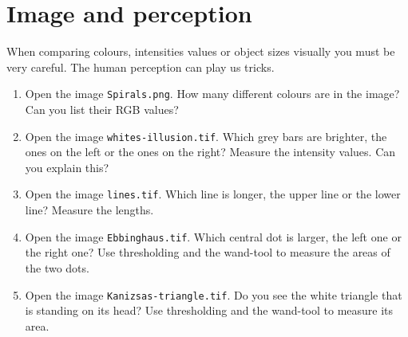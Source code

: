 \section{Image and perception}

When comparing colours, intensities values or object sizes visually you must be very careful. The human perception can play us tricks.

\begin{enumerate}

\item Open the image \texttt{Spirals.png}. How many different colours are in the image? Can you list their RGB values?

\fbox{
	\begin{minipage}{\linewidth}
		\hfill\vspace{1cm}
	\end{minipage}
	}

\item Open the image \texttt{whites-illusion.tif}. Which grey bars are brighter, the ones on the left or the ones on the right? Measure the intensity values. Can you explain this?

\fbox{
	\begin{minipage}{\linewidth}
		\hfill\vspace{1cm}
	\end{minipage}
	}

\item Open the image \texttt{lines.tif}. Which line is longer, the upper line or the lower line? Measure the lengths.

\fbox{
	\begin{minipage}{\linewidth}
		\hfill\vspace{1cm}
	\end{minipage}
	}

\item Open the image \texttt{Ebbinghaus.tif}. Which central dot is larger, the left one or the right one? Use thresholding and the wand-tool to measure the areas of the two dots.

\fbox{
	\begin{minipage}{\linewidth}
		\hfill\vspace{1cm}
	\end{minipage}
	}

\item Open the image \texttt{Kanizsas-triangle.tif}. Do you see the white triangle that is standing on its head? Use thresholding and the wand-tool to measure its area.

\fbox{
	\begin{minipage}{\linewidth}
		\hfill\vspace{1cm}
	\end{minipage}
	}
\end{enumerate}